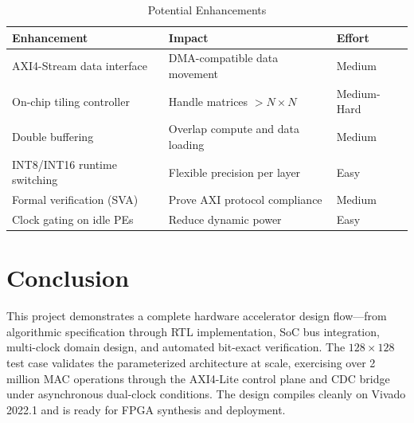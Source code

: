 \documentclass[12pt, a4paper]{article}
\begin{document}
\begin{table}[H]
\centering
\caption{Potential Enhancements}
\begin{tabular}{@{}lll@{}}
\toprule
\textbf{Enhancement} & \textbf{Impact} & \textbf{Effort} \\
\midrule
AXI4-Stream data interface  & DMA-compatible data movement     & Medium \\
On-chip tiling controller   & Handle matrices $> N \times N$   & Medium-Hard \\
Double buffering            & Overlap compute and data loading & Medium \\
INT8/INT16 runtime switching & Flexible precision per layer    & Easy \\
Formal verification (SVA)   & Prove AXI protocol compliance    & Medium \\
Clock gating on idle PEs    & Reduce dynamic power             & Easy \\
\bottomrule
\end{tabular}
\end{table}

\section{Conclusion}

This project demonstrates a complete hardware accelerator design flow---from algorithmic specification through RTL implementation, SoC bus integration, multi-clock domain design, and automated bit-exact verification. The $128 \times 128$ test case validates the parameterized architecture at scale, exercising over 2 million MAC operations through the AXI4-Lite control plane and CDC bridge under asynchronous dual-clock conditions. The design compiles cleanly on Vivado 2022.1 and is ready for FPGA synthesis and deployment.
\end{document}
